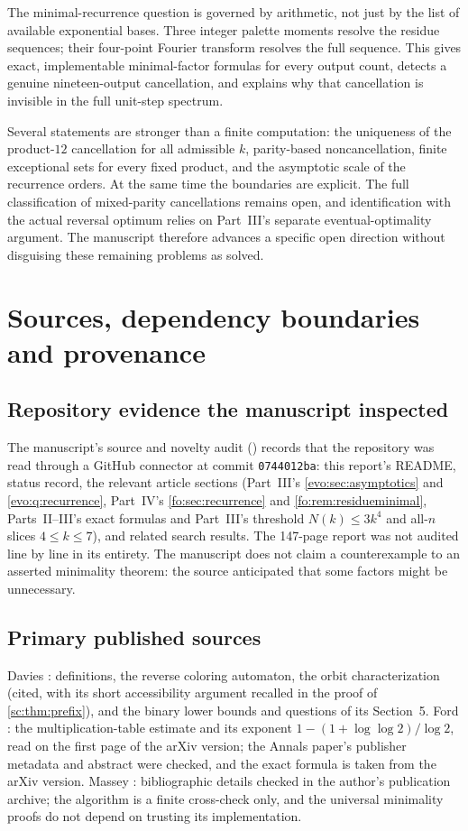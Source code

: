 \documentclass[11pt,a4paper]{article}
\numberwithin{equation}{section}
\theoremstyle{definition}
\theoremstyle{remark}
\begin{document}
The minimal-recurrence question is governed by arithmetic, not just by
the list of available exponential bases. Three integer palette moments
resolve the residue sequences; their four-point Fourier transform
resolves the full sequence. This gives exact, implementable minimal-factor
formulas for every output count, detects a genuine nineteen-output
cancellation, and explains why that cancellation is invisible in the
full unit-step spectrum.

Several statements are stronger than a finite computation: the uniqueness
of the product-$12$ cancellation for all admissible $k$, parity-based
noncancellation, finite exceptional sets for every fixed product, and the
asymptotic scale of the recurrence orders. At the same time the boundaries
are explicit. The full classification of mixed-parity cancellations
remains open, and identification with the actual reversal optimum relies
on Part~III's separate eventual-optimality argument. The manuscript
therefore advances a specific open direction without disguising
these remaining problems as solved.

\section{Sources, dependency boundaries and provenance}\label{sc:sec:audit}

\subsection{Repository evidence the manuscript inspected}
The manuscript's source and novelty audit
() records that the repository was
read through a GitHub connector at commit \texttt{0744012ba}: this report's
README, status record, the relevant article sections (Part~III's
\cref{evo:sec:asymptotics} and \cref{evo:q:recurrence}, Part~IV's
\cref{fo:sec:recurrence} and \cref{fo:rem:residueminimal}, Parts~II--III's
exact formulas and Part~III's threshold $N(k)\le3k^4$ and all-$n$ slices
$4\le k\le7$), and related search results. The 147-page report was not
audited line by line in its entirety. The manuscript does not claim a
counterexample to an asserted minimality theorem: the source anticipated
that some factors might be unnecessary.

\subsection{Primary published sources}
Davies \cite{Davies2017}: definitions, the reverse coloring automaton, the
orbit characterization (cited, with its short accessibility argument
recalled in the proof of \cref{sc:thm:prefix}), and the binary lower bounds
and questions of its Section~5. Ford \cite{FordShort,FordAnnals}: the
multiplication-table estimate and its exponent
$1-(1+\log\log2)/\log2$, read on the first page of the arXiv version; the
Annals paper's publisher metadata and abstract were checked, and the exact
formula is taken from the arXiv version. Massey \cite{Massey}: bibliographic
details checked in the author's publication archive; the algorithm is a
finite cross-check only, and the universal minimality proofs do not depend
on trusting its implementation.
\end{document}
